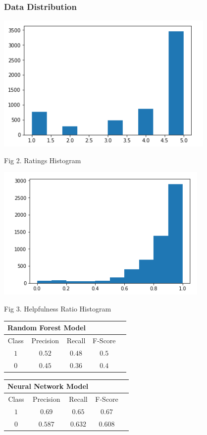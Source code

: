 \documentclass[12pt,journal,compsoc]{IEEEtran}
\begin{document}
\subsubsection{Data Distribution}
\begin{center}
\includegraphics[scale=0.6]{Amazon_rating.PNG}

{\small Fig 2. Ratings Histogram}
\end{center}

\begin{center}
\includegraphics[scale=0.6]{Amazon_helpfulness.PNG}

{\small Fig 3. Helpfulness Ratio Histogram}
\end{center}

\begin{tabular}{|c|c|c|c|c|}
\multicolumn{3}{c}{Random Forest Model}\\
\hline
Class & Precision & Recall & F-Score\\
\hline
$1$ &$0.52$ &$0.48$ &$0.5$\\
\hline
$0$ &$0.45$ &$0.36$ &$0.4$\\
\hline
\end{tabular}
\vspace{0.2cm}

\begin{tabular}{|c|c|c|c|c|}
\multicolumn{3}{c}{Neural Network Model}\\
\hline
Class & Precision & Recall & F-Score\\
\hline
$1$ &$0.69$ &$0.65$ &$0.67$\\
\hline
$0$ &$0.587$ &$0.632$ &$0.608$\\
\hline
\end{tabular}
\vspace{0.2cm}
\end{document}
